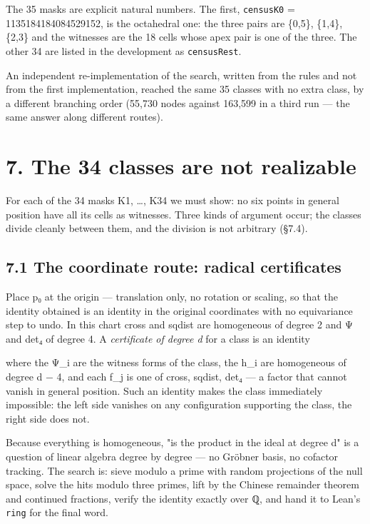 \documentclass[11pt,a4paper]{article}
\theoremstyle{named}
\newcommand{\dispf}[1]{\par\smallskip{\centering #1\par}\smallskip}
\begin{document}
The 35 masks are explicit natural numbers. The first, \texttt{censusK0} = 1135184184084529152, is the octahedral one: the three pairs are \{0,5\}, \{1,4\}, \{2,3\} and the witnesses are the 18 cells whose apex pair is one of the three. The other 34 are listed in the development as \texttt{censusRest}.

An independent re-implementation of the search, written from the rules and not from the first implementation, reached the same 35 classes with no extra class, by a different branching order (55,730 nodes against 163,599 in a third run — the same answer along different routes).

\section*{7. The 34 classes are not realizable}

For each of the 34 masks K1, …, K34 we must show: no six points in general position have all its cells as witnesses. Three kinds of argument occur; the classes divide cleanly between them, and the division is not arbitrary (§7.4).

\subsection*{7.1 The coordinate route: radical certificates}

Place p₀ at the origin — translation only, no rotation or scaling, so that the identity obtained is an identity in the original coordinates with no equivariance step to undo. In this chart cross and sqdist are homogeneous of degree 2 and Ψ and det₄ of degree 4. A \textit{certificate of degree d} for a class is an identity

\dispf{Σ\_i h\_i · Ψ\_i = Π\_j f\_j,}

where the Ψ\_i are the witness forms of the class, the h\_i are homogeneous of degree d − 4, and each f\_j is one of cross, sqdist, det₄ — a factor that cannot vanish in general position. Such an identity makes the class immediately impossible: the left side vanishes on any configuration supporting the class, the right side does not.

Because everything is homogeneous, "is the product in the ideal at degree d" is a question of linear algebra degree by degree — no Gröbner basis, no cofactor tracking. The search is: sieve modulo a prime with random projections of the null space, solve the hits modulo three primes, lift by the Chinese remainder theorem and continued fractions, verify the identity exactly over ℚ, and hand it to Lean's \texttt{ring} for the final word.
\end{document}
